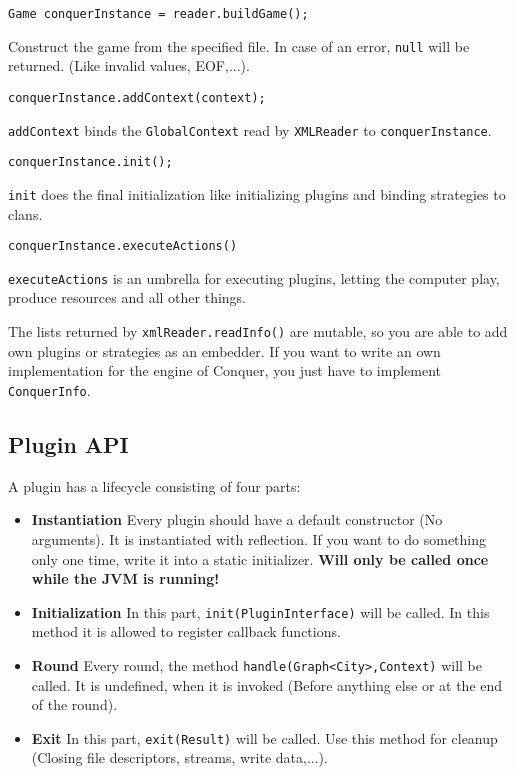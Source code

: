 \documentclass{article}
\begin{document}
\begin{verbatim}
Game conquerInstance = reader.buildGame();
\end{verbatim}
Construct the game from the specified file. In case of an error, \texttt{null} will be returned. (Like invalid values, EOF,...).
\begin{verbatim}
conquerInstance.addContext(context);
\end{verbatim}
\texttt{addContext} binds the \texttt{GlobalContext} read by \texttt{XMLReader} to \texttt{conquerInstance}.
\begin{verbatim}
conquerInstance.init();
\end{verbatim}
\texttt{init} does the final initialization like initializing plugins and binding strategies to clans.
\begin{verbatim}
conquerInstance.executeActions()
\end{verbatim}
\texttt{executeActions} is an umbrella for executing plugins, letting the computer play, produce resources and all other things.\newline

The lists returned by \texttt{xmlReader.readInfo()} are mutable, so you are able to add own plugins or strategies as an embedder.\newline
If you want to write an own implementation for the engine of Conquer, you just have to implement \texttt{ConquerInfo}.

\subsection{Plugin API}
A plugin has a lifecycle consisting of four parts:
\begin{itemize}
	\item \textbf{Instantiation} Every plugin should have a default constructor (No arguments). It is instantiated with reflection. If you want to do something only one time, write it into a static initializer. \textbf{Will only be called once while the JVM is running!}
	\item \textbf{Initialization} In this part, \texttt{init(PluginInterface)} will be called. In this method it is allowed to register callback functions. 
	\item \textbf{Round} Every round, the method \texttt{handle(Graph<City>,Context)} will be called. It is undefined, when it is invoked (Before anything else or at the end of the round).
	\item \textbf{Exit} In this part, \texttt{exit(Result)} will be called. Use this method for cleanup (Closing file descriptors, streams, write data,...).
	
\end{itemize}
\end{document}
